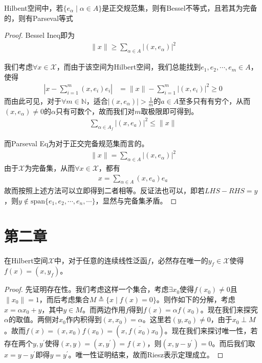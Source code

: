 	\begin{theorem}
		Hilbent空间中，若$\{e_{\alpha}\mid \alpha\in A\}$是正交规范集，则有Bessel不等式，且若其为完备的，则有Parseval等式
	\end{theorem}
	\begin{proof}
		Bessel Ineq即为
		\begin{align*}
			\|x\| \geqslant \sum\limits_{\alpha\in A} \left|(x,e_{\alpha})\right|^2
		\end{align*}
		
		我们考虑$\forall x\in\mathscr{X}$，而由于该空间为Hilbert空间，我们总能找到$e_1,e_2,\cdots,e_m\in A$，使得
		\begin{align*}
			\left|x - \sum\limits_{i=1}^m (x,e_i)e_i \right| & = \|x\| - \sum\limits_{i=1}^m |(x,e_i)|^2 \geqslant 0
		\end{align*}
		而由此可见，对于$\forall m\in\mathbb{N}$，适合$|(x,e_{\alpha})| > \frac{1}{m}$的$a\in A$至多只有有穷个，从而$(x,e_{\alpha}) \neq 0$的$\alpha$只有可数个，故而我们对$m$取极限即可得到。
		\begin{align*}
			\sum\limits_{\alpha\in A_f} |(x,e_a)|^2 \leqslant \|x\|
		\end{align*}
		
		而Parseval Eq为对于正交完备规范集而言的。
		\begin{align*}
			\|x\| = \sum\limits_{\alpha\in A} \left|(x,e_{\alpha})\right|^2
		\end{align*}
		由于$\mathscr{X}$为完备集，从而$\forall x\in\mathscr{X}$，都有
		\begin{align*}
			x = \sum\limits_{\alpha\in A} (x,e_a)e_a 
		\end{align*}
		故而按照上述方法可以立即得到二者相等。反证法也可以，即若$LHS - RHS = y$，则$y\notin\text{span}\{e_1,e_2,\cdots,e_n,\cdots\}$，显然与完备集矛盾。
	\end{proof}
	
	\section{第二章}
	\begin{theorem}[Riesz表示定理]
		在Hilbert空间$\mathscr{X}$中，对于任意的连续线性泛函$f$，必然存在唯一的$y_f\in \mathscr{X}$使得$f(x) = (x,y_f)$。
	\end{theorem}
	\begin{proof}
		先证明存在性。我们考虑这样一个集合，考虑$\exists x_0$使得$f(x_0)\neq 0$且$\|x_0\| = 1$，而后考虑集合$M \triangleq \{x\mid f(x) = 0\}$。则作如下的分解，考虑$x = \alpha x_0 + y$，其中$y \in M$。而两边作用$f$得到$f(x) = \alpha f(x_0)$。现在我们来探究$\alpha$的取值。两侧对$x_0$作内积得到$(x,x_0) = \alpha$。这里若$(y,x_0)\neq 0$，由于$x_0\perp M$。故而$f(x) = (x,x_0)f(x_0) = (x, \overline{f(x_0)}x_0)$。现在我们来探讨唯一性，若存在两个$y,y^{\prime}$使得$(x,y) = (x,y^{\prime}) = f(x)$，则$(x,y-y^{\prime})=0$。而后我们取$x = y - y^{\prime}$即得$y = y^{\prime}$。唯一性证明结束，故而Riesz表示定理成立。
	\end{proof}
	
